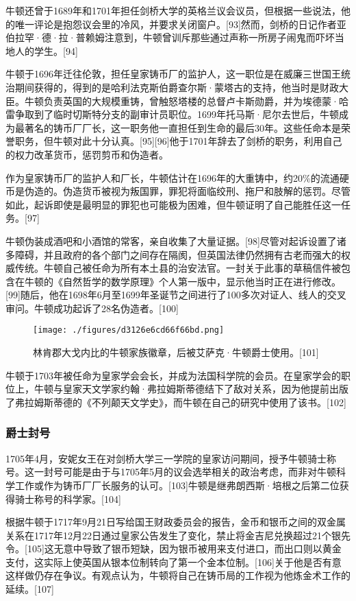 牛顿还曾于1689年和1701年担任剑桥大学的英格兰议会议员，但根据一些说法，他的唯一评论是抱怨议会里的冷风，并要求关闭窗户。[93]然而，剑桥的日记作者亚伯拉罕·德·拉·普赖姆注意到，牛顿曾训斥那些通过声称一所房子闹鬼而吓坏当地人的学生。[94]

牛顿于1696年迁往伦敦，担任皇家铸币厂的监护人，这一职位是在威廉三世国王统治期间获得的，得到的是哈利法克斯伯爵查尔斯·蒙塔古的支持，他当时是财政大臣。牛顿负责英国的大规模重铸，曾触怒塔楼的总督卢卡斯勋爵，并为埃德蒙·哈雷争取到了临时切斯特分支的副审计员职位。1699年托马斯·尼尔去世后，牛顿成为最著名的铸币厂厂长，这一职务他一直担任到生命的最后30年。这些任命本是荣誉职务，但牛顿对此十分认真。[95][96]他于1701年辞去了剑桥的职务，利用自己的权力改革货币，惩罚剪币和伪造者。

作为皇家铸币厂的监护人和厂长，牛顿估计在1696年的大重铸中，约20\%的流通硬币是伪造的。伪造货币被视为叛国罪，罪犯将面临绞刑、拖尸和肢解的惩罚。尽管如此，起诉即使是最明显的罪犯也可能极为困难，但牛顿证明了自己能胜任这一任务。[97]

牛顿伪装成酒吧和小酒馆的常客，亲自收集了大量证据。[98]尽管对起诉设置了诸多障碍，并且政府的各个部门之间存在隔阂，但英国法律仍然拥有古老而强大的权威传统。牛顿自己被任命为所有本土县的治安法官。一封关于此事的草稿信件被包含在牛顿的《自然哲学的数学原理》个人第一版中，显示他当时正在进行修改。[99]随后，他在1698年6月至1699年圣诞节之间进行了100多次对证人、线人的交叉审问。牛顿成功起诉了28名伪造者。[100]
\begin{figure}[ht]
\centering
\texttt{[image: ./figures/d3126e6cd66f66bd.png]}
\caption{林肯郡大戈内比的牛顿家族徽章，后被艾萨克·牛顿爵士使用。[101]} \label{fig_Newton_9}
\end{figure}
牛顿于1703年被任命为皇家学会会长，并成为法国科学院的会员。在皇家学会的职位上，牛顿与皇家天文学家约翰·弗拉姆斯蒂德结下了敌对关系，因为他提前出版了弗拉姆斯蒂德的《不列颠天文学史》，而牛顿在自己的研究中使用了该书。[102]
\subsubsection{爵士封号}  
1705年4月，安妮女王在对剑桥大学三一学院的皇家访问期间，授予牛顿骑士称号。这一封号可能是由于与1705年5月的议会选举相关的政治考虑，而非对牛顿科学工作或作为铸币厂厂长服务的认可。[103]牛顿是继弗朗西斯·培根之后第二位获得骑士称号的科学家。[104]

根据牛顿于1717年9月21日写给国王财政委员会的报告，金币和银币之间的双金属关系在1717年12月22日通过皇家公告发生了变化，禁止将金吉尼兑换超过21个银先令。[105]这无意中导致了银币短缺，因为银币被用来支付进口，而出口则以黄金支付，这实际上使英国从银本位制转向了第一个金本位制。[106]关于他是否有意这样做仍存在争议。有观点认为，牛顿将自己在铸币局的工作视为他炼金术工作的延续。[107]

